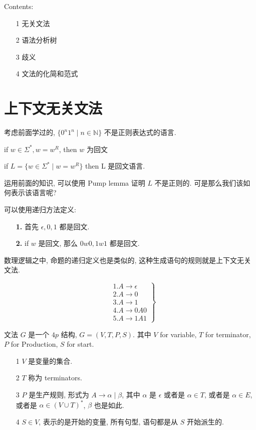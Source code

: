 \documentclass[../main.tex]{subfiles}
\begin{document}
\tableofcontents
Contents: 
\begin{itemize}
\item [1] 无关文法 
\item [2] 语法分析树
\item [3]  歧义
\item [4] 文法的化简和范式
\end{itemize}

\section{上下文无关文法}\label{sec:def}
考虑前面学过的, \(\{  0 ^{n} 1 ^{n} \mid n \in \mathbb{N}\}\) 不是正则表达式的语言. 



\begin{exam}[回文]
if \(w \in \Sigma ^{*} , w = w ^{R}\), then \(w\) 为回文
\end{exam}

\begin{exam}[回文语言]
	if \( L =  \{ w \in \Sigma ^{* } \mid w = w ^{R} \}\)
	then L 是回文语言. 
\end{exam}
运用前面的知识, 可以使用 Pump lemma 证明 \(L\) 不是正则的. 可是那么我们该如何表示该语言呢? 

可以使用递归方法定义: 
\begin{itemize}
\item [\textbf{1.}] 首先 \(\epsilon, 0 , 1\) 都是回文.
\item [\textbf{2.}] if \(w\) 是回文, 那么 \( 0  w 0 , 1 w 1 \) 都是回文. 
\end{itemize}
数理逻辑之中, 命题的递归定义也是类似的, 这种生成语句的规则就是上下文无关文法. 




\begin{equation}
\left.
\begin{aligned}
&1. A \to\epsilon \\ 
&2. A \to 0 \\ 
&3. A \to 1 \\ 
&4. A \to 0 A 0 \\ 
&5. A \to 1A1
\end{aligned}
\right\}
\end{equation}

\begin{definition}[文法]
	文法 \(G\) 是一个 \(4p\) 结构, \(G = (V , T , P , S ) \).
	其中 \(V \) for variable, \(T\) for terminator, \(P\) for Production, \(S\) for start.
	\begin{itemize}
	\item [1]  \(V\) 是变量的集合. 
	\item [2]  \(T\) 称为 terminators. 
	\item [3]  \(P\) 是生产规则, 形式为 \(A \to\alpha \mid\beta\), 其中 \(\alpha\) 是 \( \epsilon \) 或者是 \(\alpha \in T \), 或者是 \(\alpha \in E \), 或者是 \(\alpha \in (V\cup T )^{*} \), \(\beta \) 也是如此. 
	\item [4]  \( S \in V\), 表示的是开始的变量, 所有句型, 语句都是从 \( S\) 开始派生的. 
	\end{itemize}
\end{definition}
\end{document}
